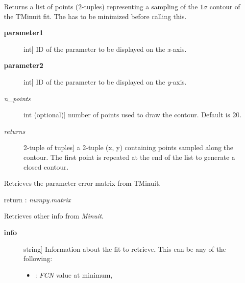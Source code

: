 \documentclass[a4paper,10pt,english]{sphinxmanual}
\begin{document}
\begin{fulllineitems}
\begin{fulllineitems}
\label{index:kafe.minuit.Minuit.get_contour}
Returns a list of points (2-tuples) representing a sampling of
the $1\sigma$ contour of the TMinuit fit. The  has to be
minimized before calling this.
\begin{description}
\item[{\textbf{parameter1}}] \leavevmode{[}int{]}
ID of the parameter to be displayed on the \emph{x}-axis.

\item[{\textbf{parameter2}}] \leavevmode{[}int{]}
ID of the parameter to be displayed on the \emph{y}-axis.

\item[{\emph{n\_points}}] \leavevmode{[}int (optional){]}
number of points used to draw the contour. Default is 20.

\item[{\emph{returns}}] \leavevmode{[}2-tuple of tuples{]}
a 2-tuple (x, y) containing  points sampled
along the contour. The first point is repeated at the end
of the list to generate a closed contour.

\end{description}

\end{fulllineitems}


\begin{fulllineitems}
\label{index:kafe.minuit.Minuit.get_error_matrix}
Retrieves the parameter error matrix from TMinuit.

return : \emph{numpy.matrix}

\end{fulllineitems}


\begin{fulllineitems}
\label{index:kafe.minuit.Minuit.get_fit_info}
Retrieves other info from \emph{Minuit}.
\begin{description}
\item[{\textbf{info}}] \leavevmode{[}string{]}
Information about the fit to retrieve.
This can be any of the following:
\begin{itemize}
\item {} 
: \emph{FCN} value at minimum,


\end{itemize}
\end{description}
\end{fulllineitems}
\end{fulllineitems}
\end{document}
